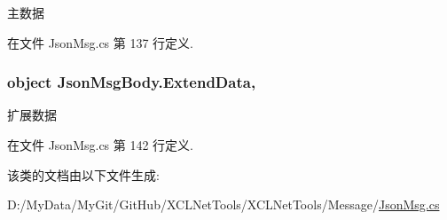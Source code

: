 主数据 



在文件 Json\-Msg.\-cs 第 137 行定义.

\hypertarget{class_json_msg_body_a065ec25afa57ebd3ff8424d0a8b6a056}{
\subsubsection[{Extend\-Data}]{\setlength{\rightskip}{0pt plus 5cm}object Json\-Msg\-Body.\-Extend\-Data\hspace{0.3cm}{\ttfamily [get]}, {\ttfamily [set]}}}\label{class_json_msg_body_a065ec25afa57ebd3ff8424d0a8b6a056}


扩展数据 



在文件 Json\-Msg.\-cs 第 142 行定义.



该类的文档由以下文件生成\-:\begin{DoxyCompactItemize}
\item 
D\-:/\-My\-Data/\-My\-Git/\-Git\-Hub/\-X\-C\-L\-Net\-Tools/\-X\-C\-L\-Net\-Tools/\-Message/\hyperlink{_json_msg_8cs}{Json\-Msg.\-cs}\end{DoxyCompactItemize}
